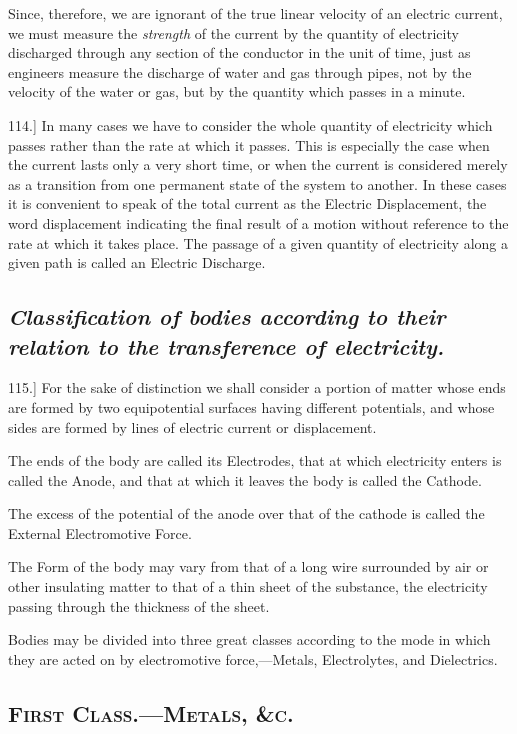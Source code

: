 \documentclass[12pt,oneside]{book}[2021/10/04]
\newcommand{\Heading}{\centering\normalfont}
\newcommand{\Section}[1]{\subsection*{\normalsize\Heading\scshape #1}}
\newcommand{\Subsection}[1]{\subsection*{\normalsize\Heading\itshape #1}}
\newcommand{\article}[1]{\phantomsection \label{art:#1}{#1.]}}
\newcommand{\¬}{\hphantom{0}}
\begin{document}
Since, therefore, we are ignorant of the true linear velocity of an
electric current, we must measure the \textit{strength} of the current by the
quantity of electricity discharged through any section of the conductor
in the unit of time, just as engineers measure the discharge
of water and gas through pipes, not by the velocity of the water or
gas, but by the quantity which passes in a minute.

\article{114} In many cases we have to consider the whole quantity of
electricity which passes rather than the rate at which it passes.
This is especially the case when the current lasts only a very short
time, or when the current is considered merely as a transition
from one permanent state of the system to another. In these cases
it is convenient to speak of the total current as the Electric
Displacement, the word displacement indicating the final result
of a motion without reference to the rate at which it takes place.
The passage of a given quantity of electricity along a given path is
called an Electric Discharge.

\Subsection{Classification of bodies according to their relation to the
transference of electricity.}

\article{115} For the sake of distinction we shall consider a portion of
matter whose ends are formed by two equipotential surfaces having
different potentials, and whose sides are formed by lines of electric
current or displacement.

\label{art:115a}
The ends of the body are called its Electrodes, that at which
electricity enters is called the Anode, and that at which it leaves
the body is called the Cathode.

\label{art:115b}
The excess of the potential of the anode over that of the cathode
is called the External Electromotive Force.

The Form of the body may vary from that of a long wire surrounded
by air or other insulating matter to that of a thin sheet of
the substance, the electricity passing through the thickness of the
sheet.

\label{art:115c}
Bodies may be divided into three great classes according to the
mode in which they are acted on by electromotive force,---Metals,
Electrolytes, and Dielectrics.

\Section{First Class.---Metals, \&c.}
\end{document}
